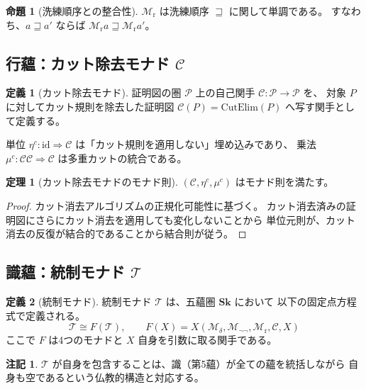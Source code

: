 \documentclass[11pt,a4paper]{ltjsarticle}
\theoremstyle{definition}
\newtheorem{definition}{定義}[section]
\newtheorem{theorem}{定理}[section]
\newtheorem{proposition}{命題}[section]
\newtheorem{remark}{注記}[section]
\newcommand{\Sk}{\mathbf{Sk}}
\newcommand{\id}{\mathrm{id}}
\newcommand{\Mdelta}{\mathcal{M}_{\delta}}
\newcommand{\Mneg}{\mathcal{M}_{\neg\neg}}
\newcommand{\Mr}{\mathcal{M}_{\mathrm{r}}}
\newcommand{\Mc}{\mathcal{C}}
\newcommand{\T}{\mathcal{T}}
\begin{document}
\begin{proposition}[洗練順序との整合性]
$\Mr$ は洗練順序 $\sqsupseteq$ に関して単調である。
すなわち、$a \sqsupseteq a'$ ならば $\Mr a \sqsupseteq \Mr a'$。
\end{proposition}

\subsection{行蘊：カット除去モナド \texorpdfstring{$\Mc$}{C}}

\begin{definition}[カット除去モナド]
証明図の圏 $\mathcal{P}$ 上の自己関手 $\Mc : \mathcal{P} \to \mathcal{P}$ を、
対象 $P$ に対してカット規則を除去した証明図 $\Mc(P) = \mathrm{CutElim}(P)$
へ写す関手として定義する。

単位 $\eta^c : \id \Rightarrow \Mc$ は「カット規則を適用しない」埋め込みであり、
乗法 $\mu^c : \Mc\Mc \Rightarrow \Mc$ は多重カットの統合である。
\end{definition}

\begin{theorem}[カット除去モナドのモナド則]
$(\Mc, \eta^c, \mu^c)$ はモナド則を満たす。
\end{theorem}
\begin{proof}
カット消去アルゴリズムの正規化可能性に基づく。
カット消去済みの証明図にさらにカット消去を適用しても変化しないことから
単位元則が、カット消去の反復が結合的であることから結合則が従う。
\end{proof}

\subsection{識蘊：統制モナド \texorpdfstring{$\T$}{T}}

\begin{definition}[統制モナド]
統制モナド $\T$ は、五蘊圏 $\Sk$ において
以下の固定点方程式で定義される。
\begin{equation}
\T \cong F(\T), \qquad F(X) = X(\Mdelta, \Mneg, \Mr, \Mc, X)
\end{equation}
ここで $F$ は4つのモナドと $X$ 自身を引数に取る関手である。
\end{definition}

\begin{remark}
$\T$ が自身を包含することは、識（第5蘊）が全ての蘊を統括しながら
自身も空であるという仏教的構造と対応する。
\end{remark}
\end{document}
